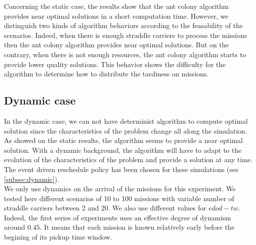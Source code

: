 \documentclass[a4paper,10pt]{article}
\begin{document}
  Concerning the static case, the results show that the ant colony algorithm provides near optimal solutions in a short computation time. However, we distinguish two kinds of algorithm behaviors according to the feasability of the scenarios. Indeed, when there is enough straddle carriers to process the missions then the ant colony algorithm provides near optimal solutions. But on the contrary, when there is not enough resources, the ant colony algorithm starts to provide lower quality solutions. This behavior shows the difficulty for the algorithm to determine how to distribute the tardiness on missions.

	\subsection{Dynamic case}
  In the dynamic case, we can not have determinist algorithm to compute optimal solution since the characteristics of the problem change all along the simulation. As showed on the static results, the algorithm seems to provide a near optimal solution. With a dynamic background, the algorithm will have to adapt to the evolution of the characteristics of the problem and provide a solution at any time. The event driven reschedule policy has been chosen for these simulations (see \ref{subsec:dynamic}).\\

  We only use dynamics on the arrival of the missions for this experiment. We tested here different scenarios of 10 to 100 missions with variable number of straddle carriers between 2 and 20. We also use different values for $edod-tw$. Indeed, the first series of experiments uses an effective degree of dynamism around $0.45$. It means that each mission is known relatively early before the begining of its pickup time window.
\end{document}
